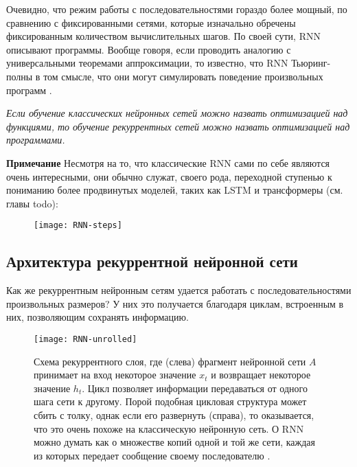 Очевидно, что режим работы с последовательностями гораздо более мощный, по сравнению 
с фиксированными сетями, которые изначально обречены фиксированным количеством 
вычислительных шагов. По своей сути, RNN описывают программы. Вообще говоря, 
если проводить аналогию с универсальными теоремами аппроксимации, то известно, что 
RNN Тьюринг-полны в том смысле, что они могут симулировать поведение произвольных 
программ \cite{karpathy}.
\begin{center}
    \textit{Если обучение классических нейронных сетей можно назвать оптимизацией над 
    функциями, то обучение рекуррентных сетей можно назвать оптимизацией над программами.}
\end{center}

\noindent\textbf{Примечание} \hspace{10pt} Несмотря на то, что классические RNN сами по себе являются очень интересными, 
они обычно служат, своего рода, переходной ступенью к пониманию более 
продвинутых моделей, таких как LSTM и трансформеры (см. главы {\color{red} todo}):

\begin{figure}[h!]
    \centering
    \texttt{[image: RNN-steps]}
    \caption{}
    \label{fig:RNN-steps}
\end{figure}

\newpage

\subsection{Архитектура рекуррентной нейронной сети}

Как же рекуррентным нейронным сетям удается работать с последовательностями 
произвольных размеров? У них это получается благодаря циклам, встроенным 
в них, позволяющим сохранять информацию.

\begin{figure}[h!]
    \centering
    \texttt{[image: RNN-unrolled]}
    \caption{Схема рекуррентного слоя, где (слева)
    фрагмент нейронной сети $A$ принимает на вход некоторое значение $x_t$ 
    и возвращает некоторое значение $h_t$. Цикл позволяет информации 
    передаваться от одного шага сети к другому. Порой подобная 
    цикловая структура может сбить с толку, однак если его развернуть 
    (справа), то оказывается, что это очень похоже на классическую нейронную 
    сеть. О RNN можно думать как о множестве копий одной и той же сети, 
    каждая из которых передает сообщение своему последователю \cite{colah2}.}
    \label{fig:RNN-unrolled}
\end{figure}

